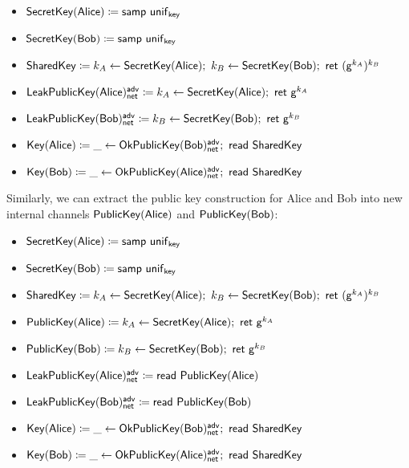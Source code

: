 \begin{itemize}
\item $\mathsf{SecretKey}(\mathsf{Alice}) \coloneqq \mathsf{samp} \ \mathsf{unif}_{\mathsf{key}}$
\item $\mathsf{SecretKey}(\mathsf{Bob}) \coloneqq \mathsf{samp} \ \mathsf{unif}_{\mathsf{key}}$
\item {\color{red} $\SharedKey \coloneqq k_A \leftarrow \SecretKey(\Alice); \ k_B \leftarrow \SecretKey(\Bob); \ \ret{(\gen^{k_A})^{k_B}}$}
\item $\LeakPublicKey(\Alice)^\adv_\net \coloneqq k_A \leftarrow \SecretKey(\Alice); \ \ret{\gen^{k_A}}$
\item $\LeakPublicKey(\Bob)^\adv_\net \coloneqq k_B \leftarrow \SecretKey(\Bob); \ \ret{\gen^{k_B}}$
\item {\color{red} $\Key(\Alice) \coloneqq \_ \leftarrow \OkPublicKey(\Bob)^\adv_\net; \ \read{\SharedKey}$}
\item {\color{red} $\Key(\Bob) \coloneqq \_ \leftarrow \OkPublicKey(\Alice)^\adv_\net; \ \read{\SharedKey}$}
\end{itemize}

\noindent Similarly, we can extract the public key construction for Alice and Bob into new internal channels $\mathsf{PublicKey}(\mathsf{Alice})$ and $\mathsf{PublicKey}(\mathsf{Bob})$:

\begin{itemize}
\item $\mathsf{SecretKey}(\mathsf{Alice}) \coloneqq \mathsf{samp} \ \mathsf{unif}_{\mathsf{key}}$
\item $\mathsf{SecretKey}(\mathsf{Bob}) \coloneqq \mathsf{samp} \ \mathsf{unif}_{\mathsf{key}}$
\item $\SharedKey \coloneqq k_A \leftarrow \SecretKey(\Alice); \ k_B \leftarrow \SecretKey(\Bob); \ \ret{(\gen^{k_A})^{k_B}}$
\item {\color{red} $\PublicKey(\Alice) \coloneqq k_A \leftarrow \SecretKey(\Alice); \ \ret{\gen^{k_A}}$}
\item {\color{red} $\mathsf{PublicKey}(\mathsf{Bob}) \coloneqq k_B \leftarrow \mathsf{SecretKey}(\mathsf{Bob}); \ \mathsf{ret} \ \mathsf{g}^{k_B}$}
\item {\color{red} $\mathsf{LeakPublicKey}(\mathsf{Alice})^{\mathsf{adv}}_{\mathsf{net}} \coloneqq \mathsf{read} \ \mathsf{PublicKey}(\mathsf{Alice})$}
\item {\color{red} $\mathsf{LeakPublicKey}(\mathsf{Bob})^{\mathsf{adv}}_{\mathsf{net}} \coloneqq \mathsf{read} \ \mathsf{PublicKey}(\mathsf{Bob})$}
\item $\Key(\Alice) \coloneqq \_ \leftarrow \OkPublicKey(\Bob)^\adv_\net; \ \read{\SharedKey}$
\item $\Key(\Bob) \coloneqq \_ \leftarrow \OkPublicKey(\Alice)^\adv_\net; \ \read{\SharedKey}$
\end{itemize}

